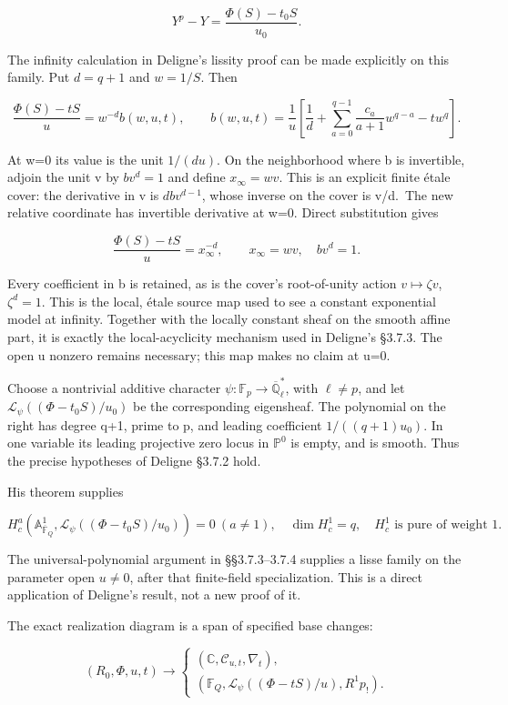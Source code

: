 \documentclass[
  11pt,
]{article}
\begin{document}
\[
\boxed{Y^p-Y=\frac{\Phi(S)-t_0S}{u_0}.}
\tag{47}
\]

The infinity calculation in Deligne's lissity proof can be made
explicitly on this family. Put \(d=q+1\) and \(w=1/S\). Then

\[
\frac{\Phi(S)-tS}{u}=w^{-d}b(w,u,t),\qquad
b(w,u,t)=\frac1u\left[\frac1d+\sum_{a=0}^{q-1}\frac{c_a}{a+1}w^{q-a}-t w^q\right].
\tag{47a}
\]

At w=0 its value is the unit \(1/(du)\). On the neighborhood where b is
invertible, adjoin the unit v by \(b v^d=1\) and define
\(x_\infty=w v\). This is an explicit finite étale cover: the derivative
in v is \(d b v^{d-1}\), whose inverse on the cover is v/d.~The new
relative coordinate has invertible derivative at w=0. Direct
substitution gives

\[
\boxed{\frac{\Phi(S)-tS}{u}=x_\infty^{-d},\qquad
x_\infty=w v,\quad b v^d=1.}
\tag{47b}
\]

Every coefficient in b is retained, as is the cover's root-of-unity
action \(v\mapsto\zeta v\), \(\zeta^d=1\). This is the local, étale
source map used to see a constant exponential model at infinity.
Together with the locally constant sheaf on the smooth affine part, it
is exactly the local-acyclicity mechanism used in Deligne's §3.7.3. The
open u nonzero remains necessary; this map makes no claim at u=0.

Choose a nontrivial additive character
\(\psi:\mathbb F_p\to\overline{\mathbb Q}_\ell^*\), with \(\ell\ne p\),
and let \(\mathcal L_\psi((\Phi-t_0S)/u_0)\) be the corresponding
eigensheaf. The polynomial on the right has degree q+1, prime to p, and
leading coefficient \(1/((q+1)u_0)\). In one variable its leading
projective zero locus in \(\mathbb P^0\) is empty, and is smooth. Thus
the precise hypotheses of Deligne §3.7.2 hold.

His theorem supplies

\[
\boxed{
H_c^a(\mathbb A^1_{\overline{\mathbb F}_Q},
\mathcal L_\psi((\Phi-t_0S)/u_0))=0\ (a\ne1),\quad
\dim H_c^1=q,\quad H_c^1\text{ is pure of weight }1.
}
\tag{48}
\]

The universal-polynomial argument in §§3.7.3--3.7.4 supplies a lisse
family on the parameter open \(u\ne0\), after that finite-field
specialization. This is a direct application of Deligne's result, not a
new proof of it.

The exact realization diagram is a span of specified base changes:

\[
(R_0,\Phi,u,t)\longrightarrow
\begin{cases}
(\mathbb C,\mathcal C_{u,t},\nabla_t),\\
(\mathbb F_Q,\mathcal L_\psi((\Phi-tS)/u),R^1p_!).
\end{cases}
\tag{49}
\]
\end{document}
